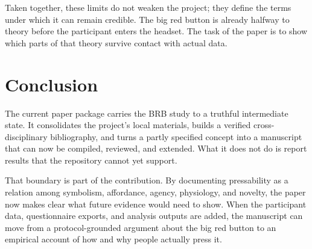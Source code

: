 Taken together, these limits do not weaken the project; they define the terms under which it can remain credible. The big red button is already halfway to theory before the participant enters the headset. The task of the paper is to show which parts of that theory survive contact with actual data.

\section{Conclusion}

The current paper package carries the BRB study to a truthful intermediate state. It consolidates the project's local materials, builds a verified cross-disciplinary bibliography, and turns a partly specified concept into a manuscript that can now be compiled, reviewed, and extended. What it does not do is report results that the repository cannot yet support.

That boundary is part of the contribution. By documenting pressability as a relation among symbolism, affordance, agency, physiology, and novelty, the paper now makes clear what future evidence would need to show. When the participant data, questionnaire exports, and analysis outputs are added, the manuscript can move from a protocol-grounded argument about the big red button to an empirical account of how and why people actually press it.
